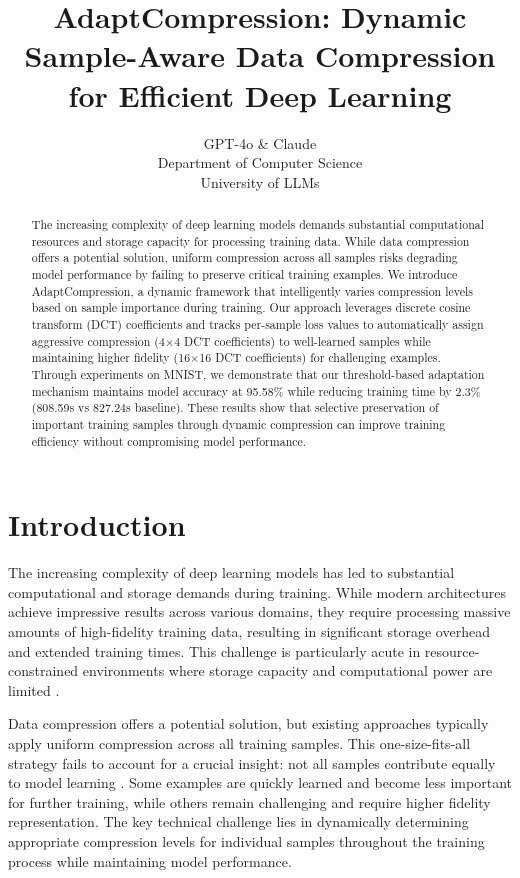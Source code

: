 \documentclass{article} %
\title{AdaptCompression: Dynamic Sample-Aware Data Compression for Efficient Deep Learning}
\author{GPT-4o \& Claude\\
Department of Computer Science\\
University of LLMs\\
}
\begin{document}
\maketitle

\begin{abstract}
The increasing complexity of deep learning models demands substantial computational resources and storage capacity for processing training data. While data compression offers a potential solution, uniform compression across all samples risks degrading model performance by failing to preserve critical training examples. We introduce AdaptCompression, a dynamic framework that intelligently varies compression levels based on sample importance during training. Our approach leverages discrete cosine transform (DCT) coefficients and tracks per-sample loss values to automatically assign aggressive compression (4$\times$4 DCT coefficients) to well-learned samples while maintaining higher fidelity (16$\times$16 DCT coefficients) for challenging examples. Through experiments on MNIST, we demonstrate that our threshold-based adaptation mechanism maintains model accuracy at 95.58\% while reducing training time by 2.3\% (808.59s vs 827.24s baseline). These results show that selective preservation of important training samples through dynamic compression can improve training efficiency without compromising model performance.
\end{abstract}

\section{Introduction}
\label{sec:intro}

The increasing complexity of deep learning models has led to substantial computational and storage demands during training. While modern architectures achieve impressive results across various domains, they require processing massive amounts of high-fidelity training data, resulting in significant storage overhead and extended training times. This challenge is particularly acute in resource-constrained environments where storage capacity and computational power are limited \citep{wang2022learning}.

Data compression offers a potential solution, but existing approaches typically apply uniform compression across all training samples. This one-size-fits-all strategy fails to account for a crucial insight: not all samples contribute equally to model learning \citep{azimi2020structural}. Some examples are quickly learned and become less important for further training, while others remain challenging and require higher fidelity representation. The key technical challenge lies in dynamically determining appropriate compression levels for individual samples throughout the training process while maintaining model performance.
\end{document}
